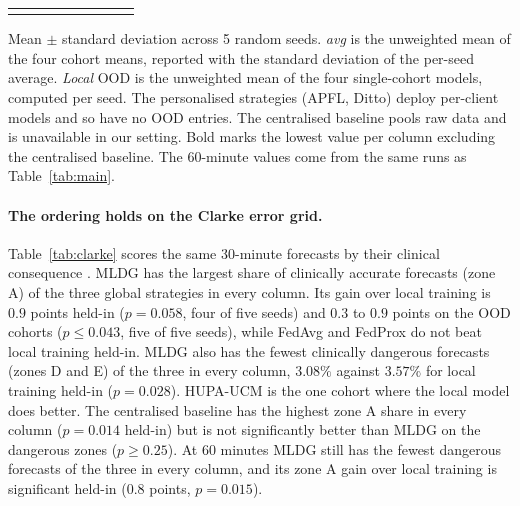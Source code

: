 \documentclass[10pt,letterpaper]{article}
\newlength\savedwidth
\newcommand\thickhline{\noalign{\global\savedwidth\arrayrulewidth\global\arrayrulewidth 2pt}%
\hline
\noalign{\global\arrayrulewidth\savedwidth}}
\begin{document}
\begin{table}[!ht]
{\begin{tabular}{lcccccccc}
\thickhline
\end{tabular}}
\begin{center}
{\small Mean $\pm$ standard deviation across 5 random seeds. \emph{avg} is the
unweighted mean of the four cohort means, reported with the standard deviation
of the per-seed average. \emph{Local} OOD is the unweighted mean of the four
single-cohort models, computed per seed. The personalised strategies (APFL,
Ditto) deploy per-client models and so have no OOD entries. The centralised
baseline pools raw data and is unavailable in our setting. Bold marks the
lowest value per column excluding the centralised baseline. The 60-minute
values come from the same runs as Table~\ref{tab:main}.}
\end{center}
\end{table}

\paragraph{The ordering holds on the Clarke error grid.} Table~\ref{tab:clarke}
scores the same 30-minute forecasts by their clinical consequence
\cite{clarke1987}. MLDG has the largest share of clinically accurate
forecasts (zone A) of the three global strategies in every column. Its gain
over local training is $0.9$ points held-in ($p = 0.058$, four of five
seeds) and $0.3$ to $0.9$ points on the OOD cohorts ($p \le 0.043$, five of
five seeds), while FedAvg and FedProx do not beat local training held-in.
MLDG also has the fewest clinically dangerous forecasts (zones D and E) of
the three in every column, $3.08\%$ against $3.57\%$ for local training
held-in ($p = 0.028$). HUPA-UCM is the one cohort where the local model does
better. The centralised baseline has the highest zone A share in every
column ($p = 0.014$ held-in) but is not significantly better than MLDG on
the dangerous zones ($p \ge 0.25$). At 60 minutes MLDG still has the fewest
dangerous forecasts of the three in every column, and its zone A gain over
local training is significant held-in ($0.8$ points, $p = 0.015$).
\end{document}

